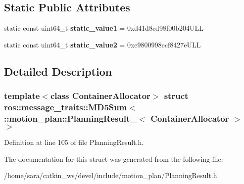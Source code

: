 \subsection*{Static Public Attributes}
\begin{DoxyCompactItemize}
\item 
\mbox{\label{structros_1_1message__traits_1_1MD5Sum_3_01_1_1motion__plan_1_1PlanningResult___3_01ContainerAllocator_01_4_01_4_acab27ed9118a9c76a4951ecb563dea50}} 
static const uint64\+\_\+t {\bfseries static\+\_\+value1} = 0xd41d8cd98f00b204\+U\+LL
\item 
\mbox{\label{structros_1_1message__traits_1_1MD5Sum_3_01_1_1motion__plan_1_1PlanningResult___3_01ContainerAllocator_01_4_01_4_aa7858546f7bcdb71e2fc86499c928b81}} 
static const uint64\+\_\+t {\bfseries static\+\_\+value2} = 0xe9800998ecf8427e\+U\+LL
\end{DoxyCompactItemize}


\subsection{Detailed Description}
\subsubsection*{template$<$class Container\+Allocator$>$\newline
struct ros\+::message\+\_\+traits\+::\+M\+D5\+Sum$<$ \+::motion\+\_\+plan\+::\+Planning\+Result\+\_\+$<$ Container\+Allocator $>$ $>$}



Definition at line 105 of file Planning\+Result.\+h.



The documentation for this struct was generated from the following file\+:\begin{DoxyCompactItemize}
\item 
/home/sara/catkin\+\_\+ws/devel/include/motion\+\_\+plan/Planning\+Result.\+h\end{DoxyCompactItemize}

